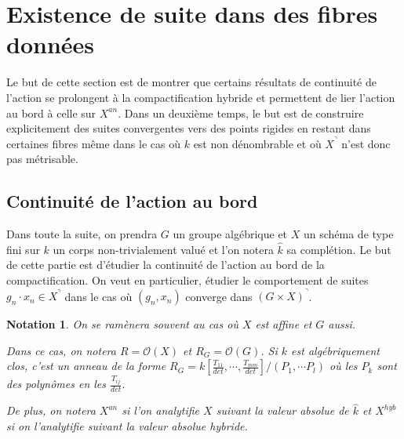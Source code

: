 \documentclass[11pt]{article}
\newtheorem{nota}[thm]{Notation}
\begin{document}
\section{Existence de suite dans des fibres données}\label{SectionConstructionSuite}

Le but de cette section est de montrer que certains résultats de continuité de l'action se prolongent à la compactification hybride et permettent de lier l'action au bord à celle sur $X^{an}$. Dans un deuxième temps, le but est de construire explicitement des suites convergentes vers des points rigides en restant dans certaines fibres même dans le cas où $k$ est non dénombrable et où $X^\urcorner$ n'est donc pas métrisable. 

\subsection{Continuité de l'action au bord}

Dans toute la suite, on prendra $G$ un groupe algébrique et $X$ un schéma de type fini sur $k$ un corps non-trivialement valué et l'on notera $\hat{k}$ sa complétion. Le but de cette partie est d'étudier la continuité de l'action au bord de la compactification. On veut en particulier, étudier le comportement de suites $g_n \cdot x_n \in X^\urcorner$ dans le cas où $(g_n, x_n)$ converge dans $(G\times X)^\urcorner$. 


\begin{nota}
On se ramènera souvent au cas où $X$ est affine et $G$ aussi.

Dans ce cas, on notera $R = \mathcal{O}(X)$ et $R_G = \mathcal{O}(G)$. Si $k$ est algébriquement clos, c'est un anneau de la forme $R_G = k[\frac{T_{11}}{det}, \cdots, \frac{T_{mm}}{det}]/(P_1, \cdots P_l)$ où les $P_k$ sont des polynômes en les $\frac{T_{ij}}{det}$. 

De plus, on notera $X^{an}$ si l'on analytifie $X$ suivant la valeur absolue de $\hat{k}$ et $X^{hyb}$ si on l'analytifie suivant la valeur absolue hybride.
\end{nota}
\end{document}
